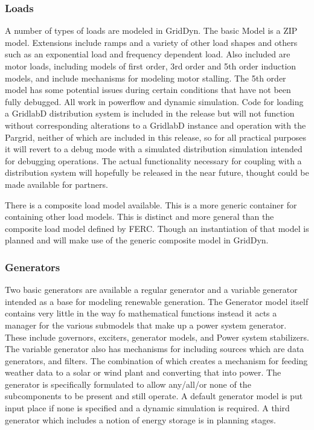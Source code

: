 \documentclass[12pt]{article} %
\begin{document}
\subsubsection{Loads}
A number of types of loads are modeled in GridDyn.  The basic Model is a ZIP model.  Extensions include ramps and a variety of other load shapes and others such as an exponential load and frequency dependent load.  Also included are motor loads, including models of first order, 3rd order and 5th order induction models, and include mechanisms for modeling motor stalling.  The 5th order model has some potential issues during certain conditions that have not been fully debugged.  All work in powerflow and dynamic simulation. Code for loading a GridlabD distribution system is included in the release but will not function without corresponding alterations to a GridlabD instance and operation with the Pargrid, neither of which are included in this release, so for all practical purposes it will revert to a debug mode with a simulated distribution simulation intended for debugging operations.  The actual functionality necessary for coupling with a distribution system will hopefully be released in the near future,  thought could be made available for partners.  

There is a composite load model available.  This is a more generic container for containing other load models.  This is distinct and more general than the composite load model defined by FERC.  Though an instantiation of that model is planned and will make use of the generic composite model in GridDyn.  

\subsubsection{Generators}
Two basic generators are available a regular generator and a variable generator intended as a base for modeling renewable generation.  The Generator model itself contains very little in the way fo mathematical functions instead it acts a manager for the various submodels that make up a power system generator.  These include governors, exciters, generator models, and Power system stabilizers.  The variable generator also has mechanisms for including sources which are data generators, and filters.  The combination of which creates a mechanism for feeding weather data to a solar or wind plant and converting that into power.  The generator is specifically formulated to allow any/all/or none of the subcomponents to be present and still operate.  A default generator model is put input place if none is specified and a dynamic simulation is required.  A third generator which includes a notion of energy storage is in planning stages.  
\end{document}
